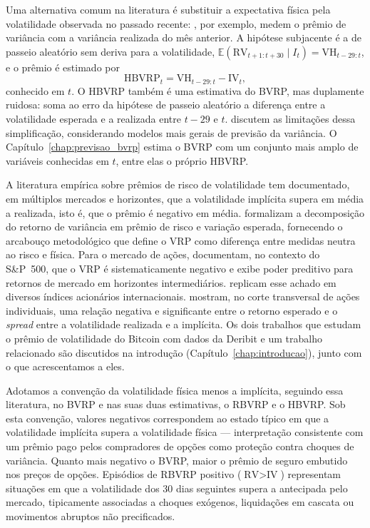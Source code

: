 Uma alternativa comum na literatura é substituir a expectativa física pela
volatilidade observada no passado recente: \citet{bollerslev2009expected}, por
exemplo, medem o prêmio de variância com a variância realizada do mês
anterior. A hipótese subjacente é a de passeio aleatório sem deriva para a
volatilidade, $\mathbb{E}(\text{RV}_{t+1:t+30} \mid I_t) = \text{VH}_{t-29:t}$,
e o prêmio é estimado por
\[
\text{HBVRP}_t = \text{VH}_{t-29:t} - \text{IV}_t,
\]
conhecido em $t$. O HBVRP também é uma estimativa do BVRP, mas duplamente
ruidosa: soma ao erro da hipótese de passeio aleatório a diferença entre a
volatilidade esperada e a realizada entre $t-29$ e $t$. \citet{bekaert2014vix}
discutem as limitações dessa simplificação, considerando modelos mais gerais
de previsão da variância. O Capítulo~\ref{chap:previsao_bvrp} estima o BVRP
com um conjunto mais amplo de variáveis conhecidas em $t$, entre elas o
próprio HBVRP.

A literatura empírica sobre prêmios de risco de volatilidade tem documentado, em múltiplos mercados e horizontes, que a volatilidade implícita supera em média a realizada, isto é, que o prêmio é negativo em média. \citet{carr2009variance} formalizam a decomposição do retorno de variância em prêmio de risco e variação esperada, fornecendo o arcabouço metodológico que define o VRP como diferença entre medidas neutra ao risco e física. Para o mercado de ações, \citet{bollerslev2009expected} documentam, no contexto do S\&P~500, que o VRP é sistematicamente negativo e exibe poder preditivo para retornos de mercado em horizontes intermediários. \citet{bollerslev2014international} replicam esse achado em diversos índices acionários internacionais. \citet{bali2009volatilitypremium} mostram, no corte transversal de ações individuais, uma relação negativa e significante entre o retorno esperado e o \textit{spread} entre a volatilidade realizada e a implícita. Os dois trabalhos que estudam o prêmio de volatilidade do Bitcoin com dados da Deribit \citep{alexanderImeraj2019, almeida2024cryptoVRP} e um trabalho relacionado \citep{han2026price} são discutidos na introdução (Capítulo~\ref{chap:introducao}), junto com o que acrescentamos a eles.

Adotamos a convenção da volatilidade física menos a implícita, seguindo essa literatura, no BVRP e nas suas duas estimativas, o RBVRP e o HBVRP. Sob esta convenção, valores negativos correspondem ao estado típico em que a volatilidade implícita supera a volatilidade física --- interpretação consistente com um prêmio pago pelos compradores de opções como proteção contra choques de variância. Quanto mais negativo o BVRP, maior o prêmio de seguro embutido nos preços de opções. Episódios de RBVRP positivo ($\text{RV} > \text{IV}$) representam situações em que a volatilidade dos 30 dias seguintes supera a antecipada pelo mercado, tipicamente associadas a choques exógenos, liquidações em cascata ou movimentos abruptos não precificados.

